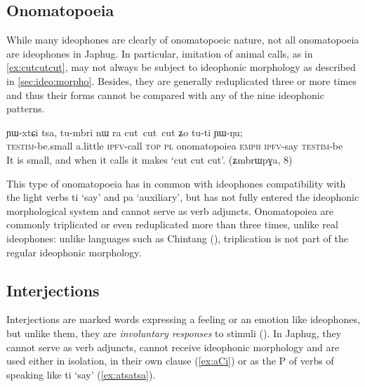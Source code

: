 \documentclass[oldfontcommands,oneside,a4paper,11pt]{article}
\newcommand{\ipa}[1]{{\phon \mbox{#1}}} %
\begin{document}
 \subsection{Onomatopoeia}
While many ideophones are clearly of onomatopoeic nature, not all onomatopoeia are ideophones in Japhug. In particular, imitation of animal calls, as in \ref{ex:cutcutcut}, may not always be subject  to  ideophonic morphology as described in \ref{sec:ideo:morpho}. Besides, they are generally reduplicated three or more times and thus their forms cannot be compared with any of the nine ideophonic patterns.

     \begin{exe}
\ex \label{ex:cutcutcut}
\gll 
 	\ipa{ɲɯ-xtɕi} 	\ipa{tsa,} 	\ipa{tu-mbri} 	\ipa{nɯ} \ipa{ra} 	\ipa{cut cut cut} \ipa{ʑo} 	\ipa{tu-ti} 	\ipa{ɲɯ-ŋu;} \\
\textsc{testim}-be.small a.little \textsc{ipfv}-call \textsc{top} \textsc{pl} onomatopoiea \textsc{emph} \textsc{ipfv}-say \textsc{testim}-be \\
\glt It is small, and when it calls it makes `cut cut cut'. (ʑmbrɯpɣa, 8)
\end{exe}
 
 This type of onomatopoeia has in common with   ideophones   compatibility with the light verbs \ipa{ti} `say' and \ipa{pa} `auxiliary', but has not fully entered the ideophonic morphological system and cannot serve as verb adjuncts. Onomatopoiea are commonly triplicated or even reduplicated more than three times, unlike real ideophones:  unlike languages such as Chintang (\citealt{rai06triplication}), triplication is not part of the regular ideophonic morphology.
 
 \subsection{Interjections}
 
 Interjections are marked words   expressing a feeling or an emotion   like ideophones, but unlike them, they are \textit{involuntary responses} to stimuli   (\citealt{dingemanse11phd}). In Japhug, they cannot serve as verb adjuncts, cannot receive ideophonic morphology and are used either in isolation, in their own clause (\ref{ex:aCi}) or as the P of verbs of speaking like \ipa{ti} `say' (\ref{ex:atsatsa}). 
\end{document}
